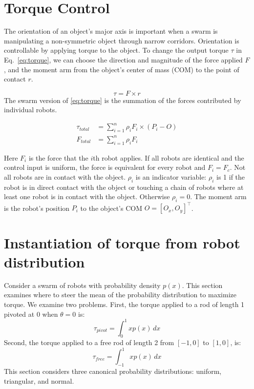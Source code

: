 \section{Torque Control}
\label{sec:theory}


The orientation of an object's major axis is important when a swarm is manipulating a non-symmetric object through narrow corridors. 
Orientation is controllable by applying torque to the object. 
To change the output torque $\tau$ in Eq.~\eqref{eq:torque}, we can choose the direction and magnitude of the force applied $F$, and the moment arm from the object's center of mass (COM) to the point of contact $r$.

\begin{equation}
\tau = F \times r\label{eq:torque}
\end{equation}
The swarm version of \eqref{eq:torque} is the summation of the forces contributed by individual robots.

\begin{align}
\tau_{total} &= \sum\limits_{i=1}^n \rho_i F_i \times (P_i - O )   \label{eq:swarmtorque}\\
F_{total} &= \sum\limits_{i=1}^n \rho_i F_i  \label{eq:swarmforce}
\end{align}

Here $F_i$ is the force that the $i$th robot applies.  If all robots are identical and the control input is uniform, the force is equivalent for every robot and $F_i = F_c$.
Not all robots are in contact with the object.  $\rho_i$ is an indicator variable: $\rho_i$ is 1 if the robot is in direct contact with the object or touching a chain of robots where at least one robot is in contact with the object. Otherwise $\rho_i = 0$.
The moment arm is the robot's position $P_i$ to the object's COM $O=[O_x,O_y]^{\top}$.

\section{Instantiation of torque from robot distribution}
Consider a swarm of robots with probability density $p(x)$. This section examines where to steer the mean of the probability distribution to maximize torque. We examine two problems. First, the torque applied to a rod of length 1 pivoted at 0 when $\theta = 0$ is:
\begin{equation}
\tau_{pivot} = \int_0^1 xp(x)\, dx
\end{equation}
Second, the torque applied to a free rod of length 2 from $[-1,0]$ to $[1,0]$, is:
\begin{equation}
\tau_{free} = \int_{-1}^1 xp(x)\, dx
\end{equation}
This section considers three canonical probability distributions: uniform, triangular, and normal. 

